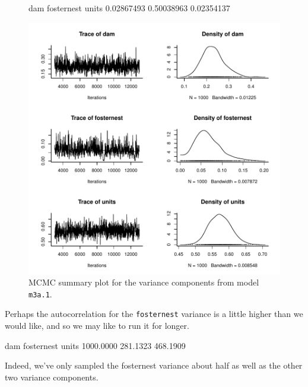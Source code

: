 \documentclass{article}
\begin{document}
\begin{figure}[!h]
\begin{center}
\begin{Schunk}
\begin{Soutput}
       dam fosternest      units 
0.02867493 0.50038963 0.02354137 
\end{Soutput}
\end{Schunk}
\includegraphics{Lecture3-005}
\end{center}
\caption{MCMC summary plot for the variance components from model \texttt{m3a.1}.}
\label{mBTVCV-fig}
\end{figure}

Perhaps the autocorrelation for the \texttt{fosternest} variance is a little higher than we would like, and so we may like to run it for longer.

\begin{Schunk}
\begin{Soutput}
       dam fosternest      units 
 1000.0000   281.1323   468.1909 
\end{Soutput}
\end{Schunk}

Indeed, we've only sampled the fosternest variance about half as well as the other two variance components.\\
\end{document}
